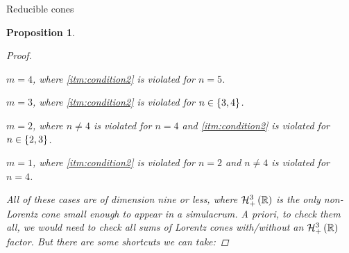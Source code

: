 \documentclass{interact}
\theoremstyle{plain}
\newtheorem{proposition}[theorem]{Proposition}
\theoremstyle{definition}
\theoremstyle{remark}
\begin{document}
\begin{section}{Reducible cones}
\begin{proposition}
\begin{proof}
        \begin{itemize}
          \begin{item}
            $m = 4$, where \cref{itm:condition2} is violated for $n = 5$.
          \end{item}
          \begin{item}
            $m = 3$, where \cref{itm:condition2} is violated for $n
            \in \left\lbrace{3,4}\right\rbrace$.
          \end{item}
          \begin{item}
            $m = 2$, where $n \ne 4$ is violated for $n = 4$ and
            \cref{itm:condition2} is violated for $n \in \left\lbrace{2,3}\right\rbrace$.
          \end{item}
          \begin{item}
            $m = 1$, where \cref{itm:condition2} is violated for $n =
            2$ and $n \ne 4$ is violated for $n = 4$.
          \end{item}
        \end{itemize}
        All of these cases are of dimension nine or less, where
        $\Hnplus[3]\of{\Rn[1]}$ is the only non-Lorentz cone small
        enough to appear in a simulacrum. A priori, to check them all,
        we would need to check all sums of Lorentz cones with/without
        an $\Hnplus[3]\of{\Rn[1]}$ factor. But there are some
        shortcuts we can take:


\end{proof}
\end{proposition}
\end{section}
\end{document}
